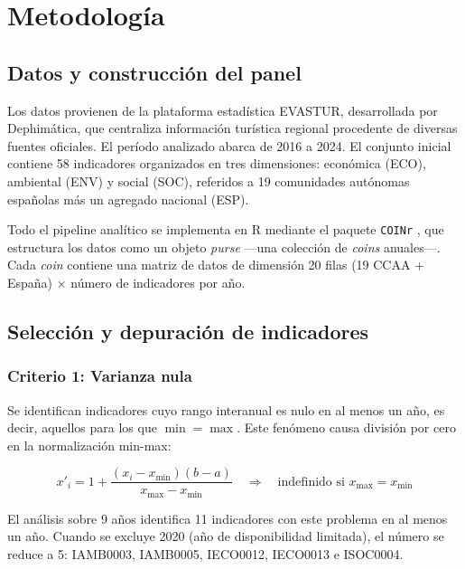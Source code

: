 
\chapter{Metodología}

\section{Datos y construcción del panel}

Los datos provienen de la plataforma estadística EVASTUR, desarrollada por Dephimática, que centraliza información turística regional procedente de diversas fuentes oficiales. El período analizado abarca de 2016 a 2024. El conjunto inicial contiene 58 indicadores organizados en tres dimensiones: económica (ECO), ambiental (ENV) y social (SOC), referidos a 19 comunidades autónomas españolas más un agregado nacional (ESP).

Todo el pipeline analítico se implementa en R mediante el paquete \texttt{COINr} \citep{becker2022coinr}, que estructura los datos como un objeto \emph{purse} —una colección de \emph{coins} anuales—. Cada \emph{coin} contiene una matriz de datos de dimensión 20 filas (19 CCAA + España) $\times$ número de indicadores por año.

\section{Selección y depuración de indicadores}

\subsection{Criterio 1: Varianza nula}

Se identifican indicadores cuyo rango interanual es nulo en al menos un año, es decir, aquellos para los que $\min = \max$. Este fenómeno causa división por cero en la normalización min-max:

\begin{equation}
    x'_i = 1 + \frac{(x_i - x_{\min})(b - a)}{x_{\max} - x_{\min}}
    \quad \Rightarrow \quad \text{indefinido si } x_{\max} = x_{\min}
\end{equation}

El análisis sobre 9 años identifica 11 indicadores con este problema en al menos un año. Cuando se excluye 2020 (año de disponibilidad limitada), el número se reduce a 5: IAMB0003, IAMB0005, IECO0012, IECO0013 e ISOC0004.

